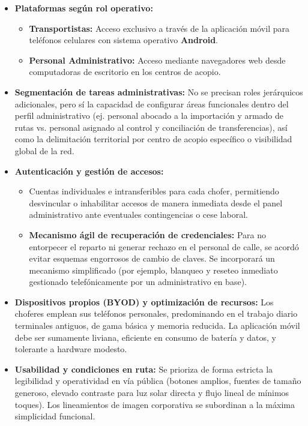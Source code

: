 \documentclass[11pt,a4paper]{article}
\begin{document}
\begin{itemize}
  \item \textbf{Plataformas según rol operativo:}
  \begin{itemize}
    \item \textbf{Transportistas:} Acceso exclusivo a través de la aplicación móvil para teléfonos celulares con sistema operativo \textbf{Android}.
    \item \textbf{Personal Administrativo:} Acceso mediante navegadores web desde computadoras de escritorio en los centros de acopio.
  \end{itemize}
  \item \textbf{Segmentación de tareas administrativas:} No se precisan roles jerárquicos adicionales, pero sí la capacidad de configurar áreas funcionales dentro del perfil administrativo (ej. personal abocado a la importación y armado de rutas vs. personal asignado al control y conciliación de transferencias), así como la delimitación territorial por centro de acopio específico o visibilidad global de la red.
  \item \textbf{Autenticación y gestión de accesos:}
  \begin{itemize}
    \item Cuentas individuales e intransferibles para cada chofer, permitiendo desvincular o inhabilitar accesos de manera inmediata desde el panel administrativo ante eventuales contingencias o cese laboral.
    \item \textbf{Mecanismo ágil de recuperación de credenciales:} Para no entorpecer el reparto ni generar rechazo en el personal de calle, se acordó evitar esquemas engorrosos de cambio de claves. Se incorporará un mecanismo simplificado (por ejemplo, blanqueo y reseteo inmediato gestionado telefónicamente por un administrativo en base).
  \end{itemize}
  \item \textbf{Dispositivos propios (BYOD) y optimización de recursos:} Los choferes emplean sus teléfonos personales, predominando en el trabajo diario terminales antiguos, de gama básica y memoria reducida. La aplicación móvil debe ser sumamente liviana, eficiente en consumo de batería y datos, y tolerante a hardware modesto.
  \item \textbf{Usabilidad y condiciones en ruta:} Se prioriza de forma estricta la legibilidad y operatividad en vía pública (botones amplios, fuentes de tamaño generoso, elevado contraste para luz solar directa y flujo lineal de mínimos toques). Los lineamientos de imagen corporativa se subordinan a la máxima simplicidad funcional.
\end{itemize}
\end{document}

